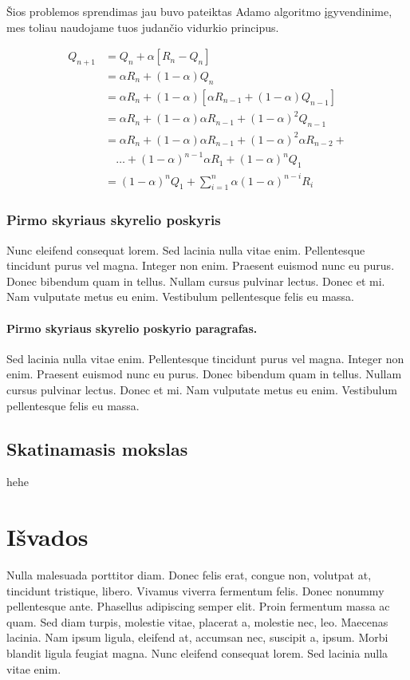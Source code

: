 \documentclass[a4paper, 12pt]{article}
\begin{document}
Šios problemos sprendimas jau buvo pateiktas Adamo algoritmo įgyvendinime, mes toliau naudojame tuos judančio vidurkio principus.

\begin{equation}
\begin{aligned}
Q_{n+1} &=Q_{n}+\alpha\left[R_{n}-Q_{n}\right] \\
&=\alpha R_{n}+(1-\alpha) Q_{n} \\
&=\alpha R_{n}+(1-\alpha)\left[\alpha R_{n-1}+(1-\alpha) Q_{n-1}\right] \\
&=\alpha R_{n}+(1-\alpha) \alpha R_{n-1}+(1-\alpha)^{2} Q_{n-1} \\
&=\alpha R_{n}+(1-\alpha) \alpha R_{n-1}+(1-\alpha)^{2} \alpha R_{n-2}+\\
& \quad \ldots+(1-\alpha)^{n-1} \alpha R_{1}+(1-\alpha)^{n} Q_{1} \\
&=(1-\alpha)^{n} Q_{1}+\sum_{i=1}^{n} \alpha(1-\alpha)^{n-i} R_{i}
\end{aligned}
\end{equation}

%
\subsubsection{Pirmo skyriaus skyrelio poskyris}
%
Nunc eleifend consequat lorem. Sed lacinia nulla vitae enim. Pellentesque 
tincidunt purus vel magna. Integer non enim. Praesent euismod nunc eu purus. 
Donec bibendum quam in tellus. Nullam cursus pulvinar lectus. Donec et mi. 
Nam vulputate metus eu enim. Vestibulum pellentesque felis eu massa.
%
\paragraph{Pirmo skyriaus skyrelio poskyrio paragrafas.} 
%

Sed lacinia nulla vitae enim. Pellentesque tincidunt purus vel magna. Integer 
non enim. Praesent euismod nunc eu purus. Donec bibendum quam in tellus. 
Nullam cursus pulvinar lectus. Donec et mi. Nam vulputate metus eu enim. 
Vestibulum pellentesque felis eu massa.
%
%
\subsection{Skatinamasis mokslas}
hehe
%
%






\newpage
\section*{Išvados}
{}
%
Nulla malesuada porttitor diam. Donec felis erat, congue non, volutpat at, 
tincidunt tristique, libero. Vivamus viverra fermentum felis. Donec nonummy 
pellentesque ante. Phasellus adipiscing semper elit. Proin fermentum massa ac 
quam. Sed diam turpis, molestie vitae, placerat a, molestie nec, leo. 
Maecenas lacinia. Nam ipsum ligula, eleifend at, accumsan nec, suscipit a, 
ipsum. Morbi blandit ligula feugiat magna. Nunc eleifend consequat lorem. Sed 
lacinia nulla vitae enim. 
\end{document}
